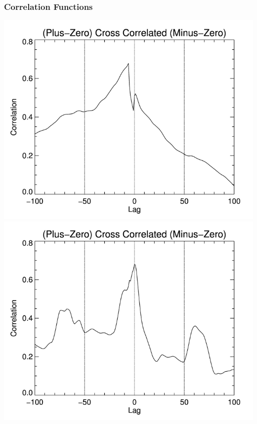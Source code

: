\documentclass[landscape,xcolor={table},10pt]{beamer}
\begin{document}
	\begin{frame}
		\frametitle{Correlation Functions}
		
		\includegraphics[scale=.23,top]{images/PZ_cc_MZ_3.png}
		\includegraphics[scale=.23,bottom]{images/pz_cc_mz_3_wishbone.png}
	\end{frame}
	
\end{document}
